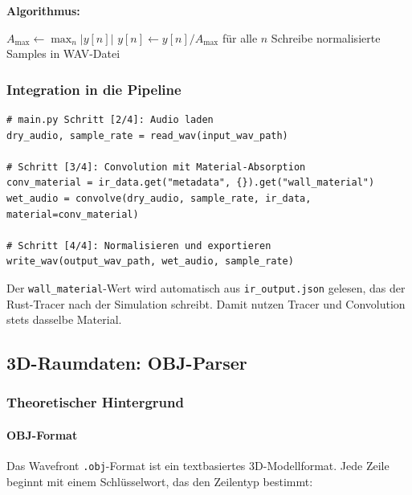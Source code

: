 \textbf{Algorithmus:}

\begin{algorithm}
    \caption{Normalisierter WAV-Export}
    \begin{algorithmic}
        \STATE $A_{\max} \gets \max_n |y[n]|$
            \STATE $y[n] \gets y[n] / A_{\max}$ f\"ur alle $n$
        \ENDIF
        \STATE Schreibe normalisierte Samples in WAV-Datei
    \end{algorithmic}
\end{algorithm}

\subsubsection{Integration in die Pipeline}

\begin{lstlisting}
# main.py Schritt [2/4]: Audio laden
dry_audio, sample_rate = read_wav(input_wav_path)

# Schritt [3/4]: Convolution mit Material-Absorption
conv_material = ir_data.get("metadata", {}).get("wall_material")
wet_audio = convolve(dry_audio, sample_rate, ir_data, material=conv_material)

# Schritt [4/4]: Normalisieren und exportieren
write_wav(output_wav_path, wet_audio, sample_rate)
\end{lstlisting}

Der \texttt{wall\_material}-Wert wird automatisch aus \texttt{ir\_output.json} gelesen, das der Rust-Tracer nach der Simulation schreibt. Damit nutzen Tracer und Convolution stets dasselbe Material.

\subsection{3D-Raumdaten: OBJ-Parser}

\subsubsection{Theoretischer Hintergrund}

\paragraph{OBJ-Format}

Das Wavefront \texttt{.obj}-Format ist ein textbasiertes 3D-Modellformat.
Jede Zeile beginnt mit einem Schl\"usselwort, das den Zeilentyp bestimmt:

